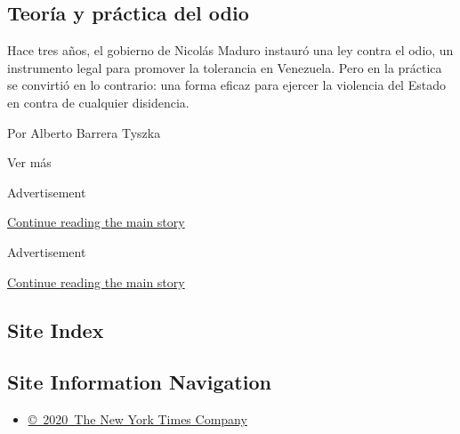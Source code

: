 \begin{enumerate}
  \hypertarget{teoruxeda-y-pruxe1ctica-del-odio}{%
  \subsection{Teoría y práctica del
  odio}\label{teoruxeda-y-pruxe1ctica-del-odio}}

  Hace tres años, el gobierno de Nicolás Maduro instauró una ley contra
  el odio, un instrumento legal para promover la tolerancia en
  Venezuela. Pero en la práctica se convirtió en lo contrario: una forma
  eficaz para ejercer la violencia del Estado en contra de cualquier
  disidencia.

  Por Alberto Barrera Tyszka
\end{enumerate}

Ver más

Advertisement

\protect\hyperlink{after-mid2}{Continue reading the main story}

Advertisement

\protect\hyperlink{after-mktg}{Continue reading the main story}

\hypertarget{site-index}{%
\subsection{Site Index}\label{site-index}}

\hypertarget{site-information-navigation}{%
\subsection{Site Information
Navigation}\label{site-information-navigation}}

\begin{itemize}
\tightlist
\item
  \href{https://help.nytimes.com/hc/en-us/articles/115014792127-Copyright-notice}{©~2020~The
  New York Times Company}
\end{itemize}

